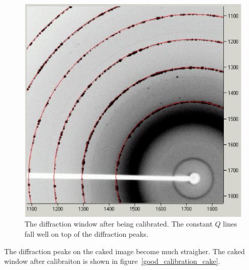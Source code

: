\begin{figure}
    \centering
    \includegraphics[scale=.75]{figures/good_calibration_diffraction_image.eps}
    \caption{The diffraction window after being calibrated. The
    constant $Q$ lines fall well on top of the diffraction 
    peaks.}
    \label{good_calibration_diffraction_image}
\end{figure}

The diffraction peaks on the caked image become much straigher.
The caked window after calibraiton is shown in 
figure~\ref{good_calibration_cake}.

